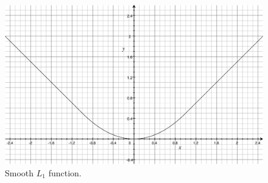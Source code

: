 \begin{figure}[!h]
	\centering
	\includegraphics[width=\figfi\textwidth]{3-10.pdf}
    \caption[Smooth $L_1$ function]{Smooth $L_1$ function.}
    \label{fig:l1loss}
\end{figure}